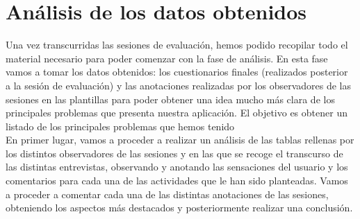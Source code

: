 \section{Análisis de los datos obtenidos}
Una vez transcurridas las sesiones de evaluación, hemos podido recopilar todo el material necesario para poder comenzar
con la fase de análisis. En esta fase vamos a tomar los datos obtenidos: los cuestionarios finales (realizados posterior a 
la sesión de evaluación) y las anotaciones realizadas por los observadores de las sesiones en las plantillas para poder obtener
una idea mucho más clara de los principales problemas que presenta nuestra aplicación. El objetivo es obtener un listado de los
principales problemas que hemos tenido \\ 

En primer lugar, vamos a proceder a realizar un análisis de las tablas rellenas por los distintos observadores de las sesiones
y en las que se recoge el transcurso de las distintas entrevistas, observando y anotando las sensaciones del usuario y los comentarios
para cada una de las actividades que le han sido planteadas. Vamos a proceder a comentar cada una de las distintas anotaciones de las sesiones,
obteniendo los aspectos más destacados y posteriormente realizar una conclusión.
